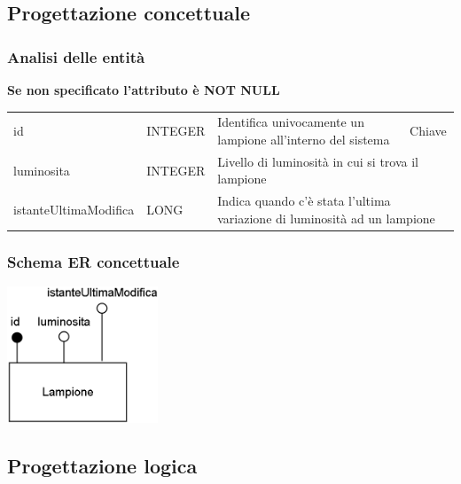 \subsection{Progettazione concettuale}

\subsubsection{Analisi delle entità}

\textbf{Se non specificato l'attributo è NOT NULL}

\begin{center}
    \begin{tabularx}{\textwidth}{|l|l|l|X|}
        \hline
        \rowcolor{gray!30}
        \multicolumn{4}{|c|}{\textbf{LAMPIONE}}\\
        \hline
        id & INTEGER & Identifica univocamente un lampione all'interno del sistema & Chiave\\
        \hline
        luminosita & INTEGER & \multicolumn{2}{l|}{Livello di luminosità in cui si trova il lampione} \\
        \hline
        istanteUltimaModifica & LONG & \multicolumn{2}{l|}{Indica quando c'è stata l'ultima variazione di luminosità ad un lampione} \\
        \hline
    \end{tabularx}
\end{center}

\subsubsection{Schema ER concettuale}

\begin{center}
    \includegraphics[width=4.5cm]{contenuti/specifica-basi-dati/img-sbd/coordinazione_concettuale.png}
\end{center}

\subsection{Progettazione logica}